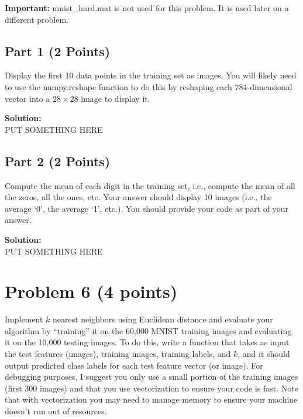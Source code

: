 \documentclass[11pt, oneside]{article}   	%
\begin{document}
\textbf{Important:} mnist\_hard.mat is not used for this problem. It is used later on a different problem. 

\subsection*{Part 1 (2 Points)}
Display the first 10 data points in the training set as images. You will likely need to use the numpy.reshape function to do this by reshaping each 784-dimensional vector into a $28 \times 28$ image to display it. 

\textbf{Solution:}\\
PUT SOMETHING HERE 

\subsection*{Part 2 (2 Points)}

Compute the mean of each digit in the training set, i.e., compute the mean of all the zeros, all the ones, etc. Your answer should display 10 images (i.e., the average `0', the average `1', etc.). You should provide your code as part of your answer. 


\textbf{Solution:}\\
PUT SOMETHING HERE 



\section*{Problem 6 (4 points)}
Implement $k$ nearest neighbors using Euclidean distance and evaluate your algorithm by ``training'' it on the 60,000 MNIST training images and evaluating it on the 10,000 testing images. To do this, write a function that takes as input the test features (images), training images, training labels, and $k$, and it should output predicted class labels for each test feature vector (or image). For debugging purposes, I suggest you only use a small portion of the training images (first 300 images) and that you use vectorization to ensure your code is fast. Note that with vectorization you may need to manage memory to ensure your machine doesn't run out of resources. 
\end{document}
